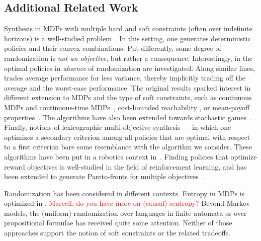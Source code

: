 \subsection{Additional Related Work}\label{sec:related}
 
Synthesis in MDPs with multiple hard and soft constraints (often over indefinite horizons) is a well-studied problem~\cite{DBLP:conf/stacs/ChatterjeeMH06,DBLP:conf/tacas/EtessamiKVY07,DBLP:conf/atva/ForejtKP12,DBLP:journals/fmsd/RandourRS17}.  In this setting, one generates deterministic policies and their convex combinations. Put differently, some degree of randomization is \emph{not an objective}, but rather a consequence. Interestingly, in \cite{DBLP:conf/tacas/DelgrangeKQR20} the optimal policies in \emph{absence} of randomization are investigated. Along similar lines, \cite{DBLP:journals/jcss/BrazdilCFK17} trades average performance for less variance, thereby implicitly trading off the average and the worst-case performance.  
The original results sparked interest in different extension to MDPs and the type of soft constraints, such as continuous MDPs \cite{DBLP:journals/csysl/HaesaertNS21} and continuous-time MDPs~\cite{DBLP:conf/cav/QuatmannJK17},  cost-bounded reachability \cite{DBLP:journals/jar/HartmannsJKQ20}, or mean-payoff properties~\cite{DBLP:journals/corr/abs-1104-3489}. 
The algorithms have also been extended towards stochastic games~\cite{DBLP:conf/mfcs/ChenFKSW13,DBLP:journals/sttt/KwiatkowskaPW18}.
Finally, notions of lexicographic multi-objective synthesis~\cite{DBLP:conf/cav/ChatterjeeKWW20} -- in which one optimizes a secondary criterion among all policies that are optimal with respect to a first criterion bare some resemblance with the algorithm we consider. 
These algorithms have been put in a robotics context in~\cite{DBLP:journals/ijrr/LacerdaFPH19}.
Finding policies that optimize reward objectives is well-studied in the field of reinforcement learning, and has been extended to generate Pareto-fronts for multiple objectives~\cite{DBLP:conf/icml/NatarajanT05,DBLP:conf/adprl/ParisiPSBR14}.

Randomization has been considered in different contexts. Entropy in MDPs is optimized in \cite{DBLP:journals/tac/SavasOCKT20}. 
\textcolor{red}{Marcell, do you have more on (causal) sentropy?}
Beyond Markov models, the (uniform) randomization over languages in finite automata \cite{DBLP:journals/siamcomp/HickeyC83,DBLP:conf/soda/KannanSM95} or over propositional formulae \cite{DBLP:journals/tcs/JerrumVV86,DBLP:journals/iandc/BellareGP00,DBLP:conf/dac/ChakrabortyMV14} has received quite some attention. Neither of those approaches support the notion of soft constraints or the related tradeoffs.

